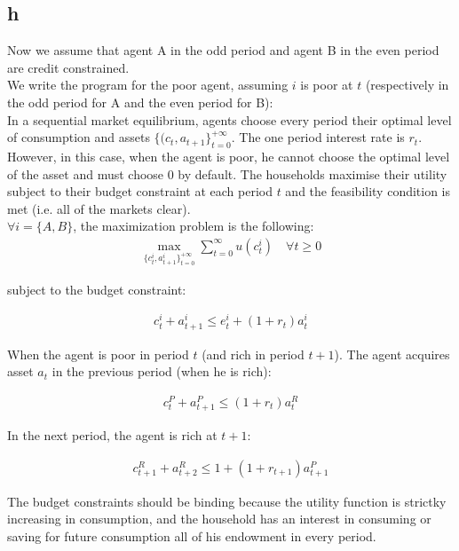 \documentclass{article}
\begin{document}
\subsection{h}
Now we assume that agent A in the odd period and agent B in the even period are credit constrained. \\

We write the program for the poor agent, assuming $i$ is poor at $t$ (respectively in the odd period for A and the even period for B): \\

In a sequential market equilibrium, agents choose every period their optimal level of consumption and assets $\{(c_t, a_{t+1}\}^{+\infty}_{t=0}$. The one period interest rate is $r_t$. However, in this case, when the agent is poor, he cannot choose the optimal level of the asset and must choose 0 by default. The households maximise their utility subject to their budget constraint at each period $t$ and the feasibility condition is met (i.e. all of the markets clear).\\

$\forall i=\{A,B\}$, the maximization problem is the following:\\
\begin{gather*}
    \max_{\{c_t^i, a_{t+1}^i\}^{+\infty}_{t=0}}\sum_{t=0}^{\infty}u(c_t^i)\quad\forall t \geq 0
\end{gather*}

subject to the budget constraint:

\begin{gather*}
    c_t^i+a^i_{t+1}\leq e_t^i+(1+r_t)a_t^i
\end{gather*}

When the agent is poor in period $t$ (and rich in period $t+1$). The agent acquires asset $a_t$ in the previous period (when he is rich):

\begin{gather*}
    c_t^P+a_{t+1}^P\leq (1+r_t)a_t^R
\end{gather*}

In the next period, the agent is rich at $t+1$:

\begin{gather*}
    c_{t+1}^R+a_{t+2}^R\leq 1 +(1+r_{t+1})a_{t+1}^P
\end{gather*}

The budget constraints should be binding because the utility function is strictky increasing in consumption, and the household has an interest in consuming or saving for future consumption all of his endowment in every period.\\
\end{document}
